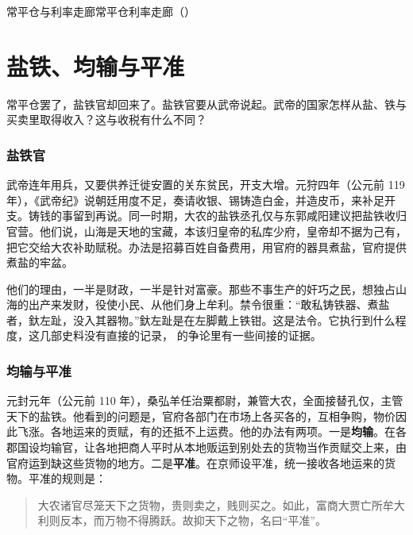 \begin{compare}{常平仓与利率走廊}{常平仓}{利率走廊（）}
\end{compare}

\section{盐铁、均输与平准}\label{sec:qinhan-monopoly}

常平仓罢了，盐铁官却回来了。盐铁官要从武帝说起。武帝的国家怎样从盐、铁与买卖里取得收入？这与收税有什么不同？

\subsubsection{盐铁官}
武帝连年用兵，又要供养迁徙安置的关东贫民，开支大增。元狩四年（公元前 119 年），《武帝纪》说朝廷用度不足，奏请收银、锡铸造白金，并造皮币，来补足开支\cite{hanshu}。铸钱的事留到再说。同一时期，大农的盐铁丞孔仅与东郭咸阳建议把盐铁收归官营。他们说，山海是天地的宝藏，本该归皇帝的私库少府，皇帝却不据为己有，把它交给大农补助赋税。办法是招募百姓自备费用，用官府的器具煮盐，官府提供煮盐的牢盆\cite{hanshu}。

他们的理由，一半是财政，一半是针对富豪。那些不事生产的奸巧之民，想独占山海的出产来发财，役使小民、从他们身上牟利。禁令很重：“敢私铸铁器、煮盐者，釱左趾，没入其器物。”\cite{hanshu}釱左趾是在左脚戴上铁钳。这是法令。它执行到什么程度，这几部史料没有直接的记录， 的争论里有一些间接的证据。

\subsubsection{均输与平准}
元封元年（公元前 110 年），桑弘羊任治粟都尉，兼管大农，全面接替孔仅，主管天下的盐铁\cite{hanshu}。他看到的问题是，官府各部门在市场上各买各的，互相争购，物价因此飞涨。各地运来的贡赋，有的还抵不上运费。他的办法有两项。一是\textbf{均输}。在各郡国设均输官，让各地把商人平时从本地贩运到别处去的货物当作贡赋交上来，由官府运到缺这些货物的地方。二是\textbf{平准}。在京师设平准，统一接收各地运来的货物\cite{hanshu}。平准的规则是：
\begin{quote}
大农诸官尽笼天下之货物，贵则卖之，贱则买之。如此，富商大贾亡所牟大利则反本，而万物不得腾跃。故抑天下之物，名曰“平准”。\cite{hanshu}
\end{quote}


